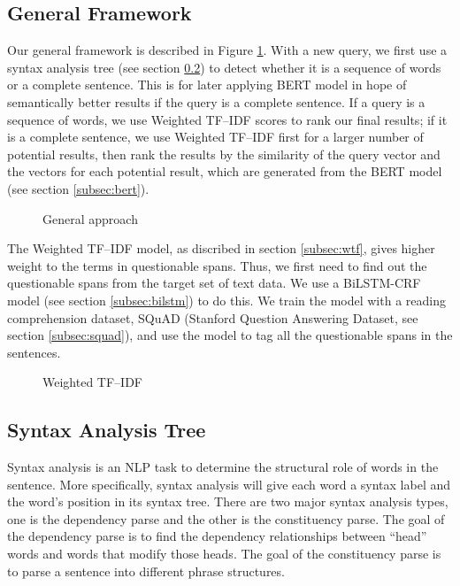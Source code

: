 \subsection{General Framework}

Our general framework is described in Figure \ref{fig:general-app-search}. With a new query, we first use a syntax analysis tree (see section \ref{subsec:syntax-analysis-tree}) to detect whether it is a sequence of words or a complete sentence. This is for later applying BERT model in hope of semantically better results if the query is a complete sentence. If a query is a sequence of words, we use Weighted TF--IDF scores to rank our final results; if it is a complete sentence, we use Weighted TF--IDF first for a larger number of potential results, then rank the results by the similarity of the query vector and the vectors for each potential result, which are generated from the BERT model (see section \ref{subsec:bert}).

\begin{figure}[h]

\caption{General approach}\label{fig:general-app-search}
\end{figure}

The Weighted TF--IDF model, as discribed in section \ref{subsec:wtf}, gives higher weight to the terms in questionable spans. Thus, we first need to find out the questionable spans from the target set of text data. We use a BiLSTM-CRF model (see section \ref{subsec:bilstm}) to do this. We train the model with a reading comprehension dataset, SQuAD (Stanford Question Answering Dataset, see section \ref{subsec:squad}), and use the model to tag all the questionable spans in the sentences.

\begin{figure}[h]

\caption{Weighted TF--IDF}\label{fig:general-app-wtf}
\end{figure}

\subsection{Syntax Analysis Tree}\label{subsec:syntax-analysis-tree}

Syntax analysis is an NLP task to determine the structural role of words in the sentence. More specifically, syntax analysis will give each word a syntax label and the word's position in its syntax tree. There are two major syntax analysis types, one is the dependency parse and the other is the constituency parse. The goal of the dependency parse is to find the dependency relationships between ``head'' words and words that modify those heads. The goal of the constituency parse is to parse a sentence into different phrase structures.

